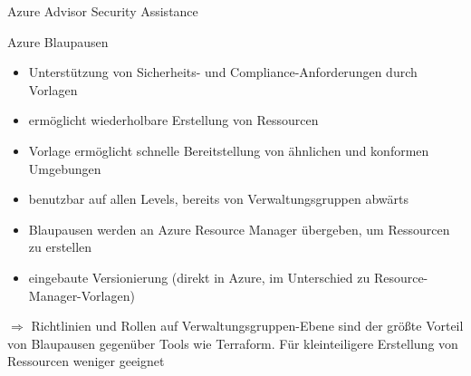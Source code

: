 \begin{flashcard}[Describe]{Azure Advisor Security Assistance}

\end{flashcard}

\begin{flashcard}[Describe]{Azure Blaupausen}
    \begin{itemize}
        \item Unterstützung von Sicherheits- und Compliance-Anforderungen durch Vorlagen
        \item ermöglicht wiederholbare Erstellung von Ressourcen
        \item Vorlage ermöglicht schnelle Bereitstellung von ähnlichen und konformen Umgebungen
        \item benutzbar auf allen Levels, bereits von Verwaltungsgruppen abwärts
        \item Blaupausen werden an Azure Resource Manager übergeben, um Ressourcen zu erstellen
        \item eingebaute Versionierung (direkt in Azure, im Unterschied zu Resource-Manager-Vorlagen)
    \end{itemize}
    $\Rightarrow$ Richtlinien und Rollen auf Verwaltungsgruppen-Ebene sind der größte Vorteil von Blaupausen gegenüber Tools wie Terraform.
    Für kleinteiligere Erstellung von Ressourcen weniger geeignet

\end{flashcard} 
